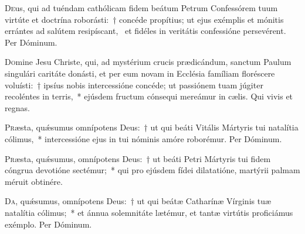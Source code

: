 \documentclass[vesperale_romanum.tex]{subfiles}
\begin{document}
\duplexmtv

\odoctoroptime

\oratio
\lettrine{D}{e}us, qui ad tuéndam cathólicam fidem beátum Petrum Confessórem tuum virtúte et doctrína roborásti:~† concéde propítius; ut ejus exémplis et mónitis errántes ad salútem resipíscant,~ et fidéles in veritátis confessióne persevérent.
Per Dóminum.


\myrule
{}

\duplexmtv

\oratio

\lettrine{D}{o}mine Jesu Christe, qui, ad mystérium crucis prædicándum, san\-ctum Paulum singulári caritáte donásti, et per eum novam in Ecclésia famíliam floréscere voluísti:~† ipsíus nobis intercessióne concéde; ut passiónem tuam júgiter recoléntes in terris,~* ejúsdem fru\-ctum cónsequi mereámur in cælis.
Qui vivis et regnas.


\oratio

\lettrine{P}{r}æsta, quǽsumus omnípotens Deus:~† ut qui beáti Vitális Mártyris tui natalítia cólimus,~* intercessióne ejus in tui nóminis amóre roborémur. Per Dóminum.

\capitdeseq

\myrule
{}

\duplex

\oratio
 \lettrine{P}{r}æsta, quǽsumus, omnípotens Deus:~† ut beáti Petri Mártyris tui fidem cóngrua devotióne sectémur;~* qui pro ejúsdem fídei dilatatióne, martýrii palmam méruit obtinére.
   
   \capitdeseq   
\myrule
{}

\duplex

\oratio

\lettrine{D}{a}, quǽsumus, omnípotens Deus:~† ut qui beátæ Catharínæ Vírginis tuæ natalítia cólimus;~* et ánnua sole\-mnitáte lætémur, et tantæ virtútis proficiámus exémplo.
Per Dóminum.
\end{document}
